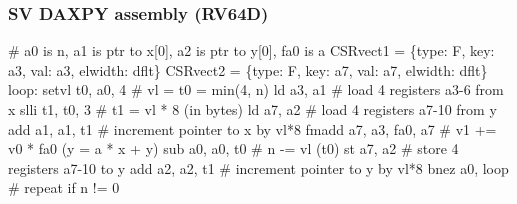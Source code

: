 \documentclass[slidestop]{beamer}
\begin{document}
\begin{frame}[fragile]
\frametitle{SV DAXPY assembly (RV64D)}

\begin{semiverbatim}
# a0 is n, a1 is ptr to x[0], a2 is ptr to y[0], fa0 is a
 CSRvect1 = \{type: F, key: a3, val: a3, elwidth: dflt\}
 CSRvect2 = \{type: F, key: a7, val: a7, elwidth: dflt\}
loop:
 setvl  t0, a0, 4       # vl = t0 = min(4, n)
 ld     a3, a1          # load 4 registers a3-6 from x
 slli   t1, t0, 3       # t1 = vl * 8 (in bytes)
 ld     a7, a2          # load 4 registers a7-10 from y
 add    a1, a1, t1      # increment pointer to x by vl*8
 fmadd  a7, a3, fa0, a7 # v1 += v0 * fa0 (y = a * x + y)
 sub    a0, a0, t0      # n -= vl (t0)
 st     a7, a2          # store 4 registers a7-10 to y
 add    a2, a2, t1      # increment pointer to y by vl*8
 bnez   a0, loop        # repeat if n != 0
\end{semiverbatim}
\end{frame}


\end{document}
